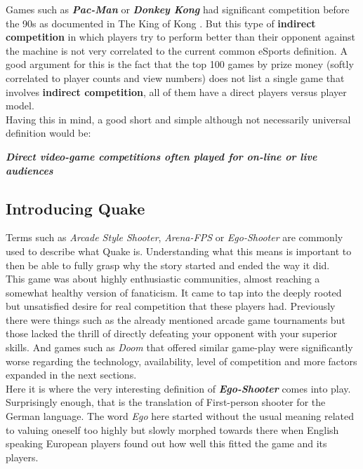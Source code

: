 Games such as \textbf{\textit{Pac-Man}} \citep{game:pacman} or \textbf{\textit{Donkey Kong}} \citep{game:donkeykong} had significant competition before the 90s as documented in The King of Kong \citep{kingKong}. But this type of \textbf{indirect competition} in which players try to perform better than their opponent against the machine is not very correlated to the current common eSports definition. A good argument for this is the fact that the top 100 games by prize money \citep{biggestEsports} (softly correlated to player counts and view numbers) does not list a single game that involves \textbf{indirect competition}, all of them have a direct players versus player model.\\

Having this in mind, a good short and simple although not necessarily universal definition would be:\\

\begin{center}
\textbf{\textit{Direct video-game competitions often played for on-line or live audiences}}
\end{center}

\subsection{Introducing Quake}

Terms such as \textit{Arcade Style Shooter}, \textit{Arena-FPS} or \textit{Ego-Shooter} are commonly used to describe what Quake is. Understanding what this means is important to then be able to fully grasp why the story started and ended the way it did.\\

This game was about highly enthusiastic communities, almost reaching a somewhat healthy version of fanaticism. It came to tap into the deeply rooted but unsatisfied desire for real competition that these players had. Previously there were things such as the already mentioned arcade game tournaments but those lacked the thrill of directly defeating your opponent with your superior skills. And games such as \textit{Doom} \citep{game:doom} that offered similar game-play were significantly worse regarding the technology, availability, level of competition and more factors expanded in the next sections.\\

Here it is where the very interesting definition of \textbf{\textit{Ego-Shooter}} comes into play. Surprisingly enough, that is the translation of First-person shooter for the German language. The word \textit{Ego} here started without the usual meaning related to valuing oneself too highly but slowly morphed towards there when English speaking European players found out how well this fitted the game and its players.\\

